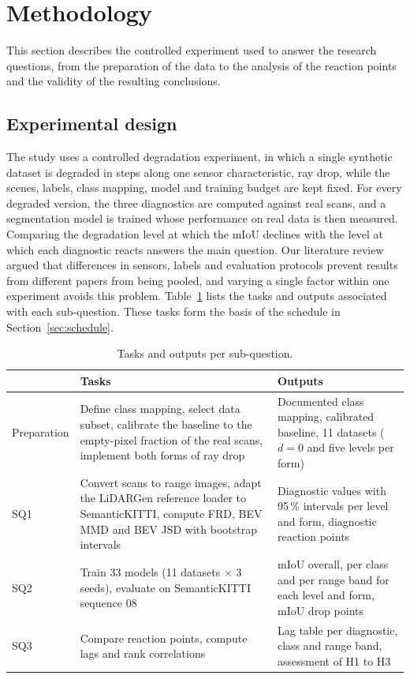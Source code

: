 \section{Methodology}\label{sec:method}
This section describes the controlled experiment used to answer the research questions, from the preparation of the data to the analysis of the reaction points and the validity of the resulting conclusions.

\subsection{Experimental design}\label{sec:design}
The study uses a controlled degradation experiment, in which a single synthetic dataset is degraded in steps along one sensor characteristic, ray drop, while the scenes, labels, class mapping, model and training budget are kept fixed. For every degraded version, the three diagnostics are computed against real scans, and a segmentation model is trained whose performance on real data is then measured. Comparing the degradation level at which the mIoU declines with the level at which each diagnostic reacts answers the main question. Our literature review argued that differences in sensors, labels and evaluation protocols prevent results from different papers from being pooled, and varying a single factor within one experiment avoids this problem. Table~\ref{tab:tasks} lists the tasks and outputs associated with each sub-question. These tasks form the basis of the schedule in Section~\ref{sec:schedule}.

\begin{table}[htbp]
\centering
\caption{Tasks and outputs per sub-question.}\label{tab:tasks}
\small
\begin{tabularx}{\linewidth}{@{}l>{\raggedright\arraybackslash}X>{\raggedright\arraybackslash}X@{}}
\toprule
 & \textbf{Tasks} & \textbf{Outputs} \\
\midrule
Preparation & Define class mapping, select data subset, calibrate the baseline to the empty-pixel fraction of the real scans, implement both forms of ray drop & Documented class mapping, calibrated baseline, 11 datasets ($d=0$ and five levels per form) \\
\addlinespace
SQ1 & Convert scans to range images, adapt the LiDARGen reference loader to SemanticKITTI, compute FRD, BEV MMD and BEV JSD with bootstrap intervals & Diagnostic values with 95\,\% intervals per level and form, diagnostic reaction points \\
\addlinespace
SQ2 & Train 33 models (11 datasets $\times$ 3 seeds), evaluate on SemanticKITTI sequence 08 & mIoU overall, per class and per range band for each level and form, mIoU drop points \\
\addlinespace
SQ3 & Compare reaction points, compute lags and rank correlations & Lag table per diagnostic, class and range band, assessment of H1 to H3 \\
\bottomrule
\end{tabularx}
\end{table}

